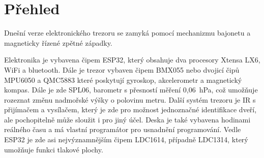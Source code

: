 \section{Přehled}

Dnešní verze elektronického trezoru se zamyká pomocí mechanizmu bajonetu a magneticky řízené zpětné západky. 

Elektronika je vybavena čipem ESP32,
který obsahuje dva procesory Xtensa LX6, WiFi a bluetooth. Dále je trezor vybaven čipem BMX055 nebo dvojicí čipů MPU6050 a QMC5883 které poskytují 
gyroskop, akcelerometr a magnetický kompas. Dále je zde SPL06, barometr s přesností měření 0,06~hPa, což umožňuje rozeznat změnu nadmořské výšky 
o polovinu metru. Další systém trezoru je IR s přijímačem a vysílačem, který je zde pro možnost jednoznačné identifikace dveří, ale pochopitelně může 
sloužit i pro jiný účel. Deska je také vybavena hodinami reálného času a má vlastní programátor pro usnadnění programování. Vedle ESP32 je zde asi 
nejvýznamnějším čipem LDC1614, případně LDC1314, který umožňuje funkci tlakové plochy.


\begin{table}[h]
    \centering
    \caption{shrnutí elektronického vybavení}
    \label{tab:COMPARATION}
\end{table}

